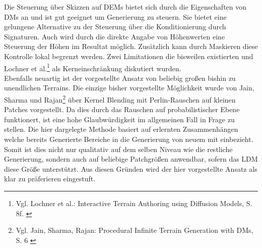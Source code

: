 Die Steuerung über Skizzen auf DEMs bietet sich durch die Eigenschaften von DMs an und ist gut geeignet um Generierung zu steuern. Sie bietet eine gelungene Alternative zu der Steuerung über die Konditionierung durch Signaturen. Auch wird durch die direkte Angabe von Höhenwerten eine Steuerung der Höhen im Resultat möglich. Zusätzlich kann durch Maskieren diese Kontrolle lokal begrenzt werden. Zwei Limitationen die bisweilen existierten und Lochner et al.\footnote{
    Vgl. Lochner et al.: Interactive Terrain Authoring using Diffusion Models, S. 8f.
    \cite{lochner2023interactive}
} als Kerneinschränkung diskutiert wurden. \\
Ebenfalls neuartig ist der vorgestellte Ansatz von beliebig großen bishin zu unendlichen Terrains. Die einzige bisher vorgestellte Möglichkeit wurde von Jain, Sharma und Rajan\footnote{
    Vgl. Jain, Sharma, Rajan: Procedural Infinite Terrain Generation with DMs, S. 6
    \cite{jain2022adaptive}
} über Kernel Blending mit Perlin-Rauschen auf kleinen Patches vorgestellt. Da dies durch das Rauschen auf probabilistischer Ebene funktionert, ist eine hohe Glaubwürdigkeit im allgemeinen Fall in Frage zu stellen. Die hier dargelegte Methode basiert auf erlernten Zusammenhängen welche bereits Generierte Bereiche in die Generierung von neuem mit einbezieht. Somit ist dies nicht nur qualitativ auf dem selben Niveau wie die restliche Generierung, sondern auch auf beliebige Patchgrößen anwendbar, sofern das LDM diese Größe unterstützt. Aus diesen Gründen wird der hier vorgestellte Ansatz als klar zu präferieren eingestuft.  

